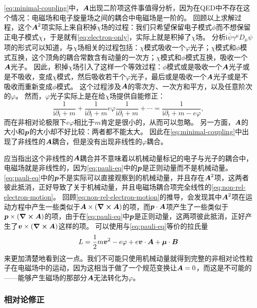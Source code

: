 \documentclass[hyperref, UTF8, a4paper]{ctexart}
\newcommand*{\ii}{\mathrm{i}}
\begin{document}
\eqref{eq:minimal-coupling}中，$\vb*{A}$出现二阶项这件事值得分析，因为在QED中不存在这个情况：电磁场和电子旋量场之间的耦合中电磁场是一阶的。
回顾以上求解过程，这个$\vb*{A}^2$项实际上来自积掉$\chi$场的过程：我们只希望保留电子模式$\phi$而不想保留正电子模式$\chi$，于是就有\eqref{eq:electron-only}，实际上就是积掉了$\chi$场。
分析$\ii \bar{\psi} \gamma^\mu D_\mu \psi$项的形式可以知道，与$\chi$场相关的过程包括：$\chi$模式吸收一个$\varphi$光子；$\chi$模式和$\phi$模式互换，这个顶角的耦合常数含有动量的一次方；$\chi$模式和$\phi$模式互换，吸收一个$\vb*{A}$光子。
因此，积掉$\chi$场引入了这样一个等效过程：$\phi$模式或是吸收一个$\vb*{A}$光子或是不吸收，变成$\chi$模式，然后吸收若干个$\varphi$光子，最后或是吸收一个$\vb*{A}$光子或是不吸收而重新变成$\phi$模式。
这个过程涉及$\vb*{A}$的零次方、一次方和平方，以及任意阶次的$\varphi$。
然而，$\varphi$光子实际上是在给$\chi$场提供自能修正：
\[
    \frac{1}{\ii \partial_t + m} + \frac{1}{\ii \partial_t + m} e \varphi \frac{1}{\ii \partial_t + m} + \cdots = \frac{1}{\ii \partial_t + m - e \varphi},
\]
而在非相对论极限下$e \varphi$相比于$m$肯定是很小的，从而可以忽略。
另一方面，$\vb*{A}$的大小和$\vb*{p}$的大小却不好比较：两者都不能太大。
因此在\eqref{eq:minimal-coupling}中出现了非线性的$\vb*{A}$耦合，但是没有出现非线性的$\varphi$耦合。

应当指出这个非线性的$\vb*{A}$耦合并不意味着以机械动量标记的电子与光子的耦合中，电磁场就是非线性的，因为\eqref{eq:pauli-eq}中的$\vb*{p}$是正则动量而不是机械动量。
\eqref{eq:pauli-eq}中的$\vb*{p}$不是实际可以直接观察到的机械动量，并且存在$\vb*{A}^2$项，这两者彼此抵消，正好导致了关于机械动量，并且电磁场耦合项完全线性的\eqref{eq:non-rel-electron-motion}。
回顾\eqref{eq:non-rel-electron-motion}的推导，会发现其中$\vb*{A}^2$项在运动方程中产生一些类似于$\vb*{A} \times (\curl{\vb*{A}})$的项，而$\vb*{p} \cdot \vb*{A}$项产生了一些类似于$\vb*{p} \times (\curl{\vb*{A}})$的项，由于在\eqref{eq:pauli-eq}中$\vb*{p}$是正则动量，这两项彼此抵消，正好产生了$\vb*{v} \times (\curl{\vb*{A}})$这样的项。
可以使用与\eqref{eq:pauli-eq}等价的拉氏量
\begin{equation}
    L = \frac{1}{2} m \vb*{v}^2 - e \varphi + e \vb*{v} \cdot \vb*{A} + \vb*{\mu} \cdot \vb*{B}
\end{equation}
来更加清楚地看到这一点。我们不可能只使用机械动量就得到完整的非相对论性粒子在电磁场中的运动，因为这相当于做了一个规范变换让$\vb*{A}=0$，而这是不可能的——能够产生磁场的那部分$\vb*{A}$无法转化为$\varphi$。

\subsubsection{相对论修正}
\end{document}
